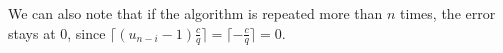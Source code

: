 We can also note that if the algorithm is repeated more than $n$ times, the error stays at 0, since 
$\lceil (u_{n-i}-1)\frac{c}{q}\rceil = \lceil -\frac{c}{q}\rceil = 0$.
